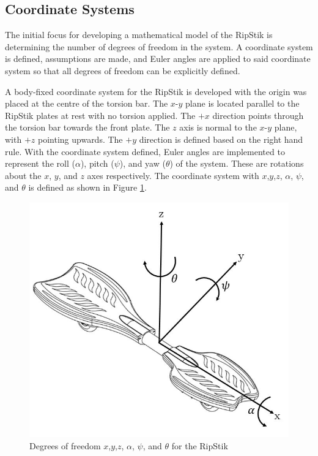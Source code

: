 \subsection{Coordinate Systems}

The initial focus for developing a mathematical model of the RipStik is determining the number of degrees of freedom in the system. 
A coordinate system is defined, assumptions are made, and Euler angles are applied to said coordinate system so that all degrees of freedom can be explicitly defined.
\par
A body-fixed coordinate system for the RipStik is developed with the origin was placed at the centre of the torsion bar. 
The $x$-$y$ plane is located parallel to the RipStik plates at rest with no torsion applied.
The $+x$ direction points through the torsion bar towards the front plate. The $z$ axis is normal to the $x$-$y$ plane, with $+z$ pointing upwards. The $+y$ direction is defined based on the right hand rule.
With the coordinate system defined, Euler angles are implemented to represent the roll ($\alpha$), pitch ($\psi$), and yaw ($\theta$) of the system. These are rotations about the $x$, $y$, and $z$ axes respectively.
The coordinate system with $x$,$y$,$z$, $\alpha$, $\psi$, and $\theta$ is defined as shown in Figure \ref{fig:RipStikCoord}.
\begin{figure}[!htb]
	\centering
	\includegraphics[width=\linewidth]{DOFpart1.jpg}
	\caption{Degrees of freedom $x$,$y$,$z$, $\alpha$, $\psi$, and $\theta$ for the RipStik}\label{fig:RipStikCoord}
	\endminipage
\end{figure}

